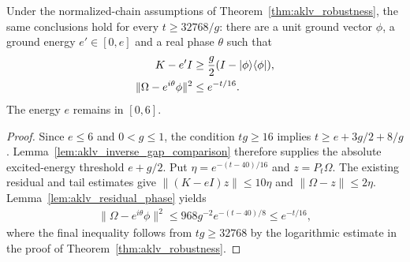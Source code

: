 \begin{theorem}
    \label{thm:aklv_inverse_gap_robustness}
    \leanok
    Under the normalized-chain assumptions of
    Theorem~\ref{thm:aklv_robustness}, the same conclusions hold for every
    $t\ge32768/g$: there are a unit ground vector $\phi$, a ground energy
    $e'\in[0,e]$ and a real phase $\theta$ such that
    \begin{align}
        K-e'I                        & \ge\frac g2(I-|\phi\rangle\langle\phi|),\notag \\
        \|\Omega-e^{i\theta}\phi\|^2 & \le e^{-t/16}.
    \end{align}
    The energy $e$ remains in $[0,6]$.
\end{theorem}
\begin{proof}\leanok
    Since $e\le6$ and $0<g\le1$, the condition $tg\ge16$ implies
    $t\ge e+3g/2+8/g$. Lemma~\ref{lem:aklv_inverse_gap_comparison}
    therefore supplies the absolute excited-energy threshold $e+g/2$.
    Put $\eta=e^{-(t-40)/16}$ and $z=P_t\Omega$. The existing residual
    and tail estimates give $\|(K-eI)z\|\le10\eta$ and
    $\|\Omega-z\|\le2\eta$. Lemma~\ref{lem:aklv_residual_phase} yields
    \begin{align}
        \|\Omega-e^{i\theta}\phi\|^2
        \le968g^{-2}e^{-(t-40)/8}\le e^{-t/16},
    \end{align}
    where the final inequality follows from $tg\ge32768$ by the
    logarithmic estimate in the proof of Theorem~\ref{thm:aklv_robustness}.
\end{proof}
